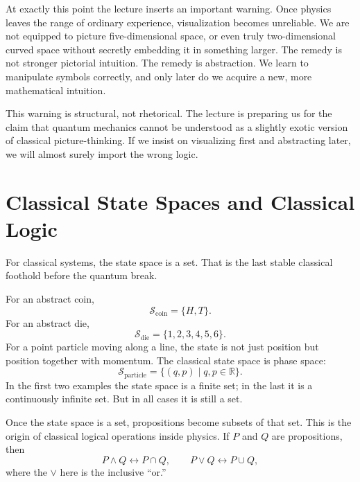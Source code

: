 At exactly this point the lecture inserts an important warning. Once physics leaves the range of ordinary experience, visualization becomes unreliable. We are not equipped to picture five-dimensional space, or even truly two-dimensional curved space without secretly embedding it in something larger. The remedy is not stronger pictorial intuition. The remedy is abstraction. We learn to manipulate symbols correctly, and only later do we acquire a new, more mathematical intuition.

\begin{remark}
This warning is structural, not rhetorical. The lecture is preparing us for the claim that quantum mechanics cannot be understood as a slightly exotic version of classical picture-thinking. If we insist on visualizing first and abstracting later, we will almost surely import the wrong logic.
\end{remark}

\section{Classical State Spaces and Classical Logic}

For classical systems, the state space is a set. That is the last stable classical foothold before the quantum break.

For an abstract coin,
\begin{equation}
\mathcal{S}_{\mathrm{coin}}=\{H,T\}.
\end{equation}
For an abstract die,
\begin{equation}
\mathcal{S}_{\mathrm{die}}=\{1,2,3,4,5,6\}.
\end{equation}
For a point particle moving along a line, the state is not just position but position together with momentum. The classical state space is phase space:
\begin{equation}
\mathcal{S}_{\mathrm{particle}}=\{(q,p)\mid q,p\in\mathbb{R}\}.
\end{equation}
In the first two examples the state space is a finite set; in the last it is a continuously infinite set. But in all cases it is still a set.

Once the state space is a set, propositions become subsets of that set. This is the origin of classical logical operations inside physics. If \(P\) and \(Q\) are propositions, then
\begin{equation}
P\wedge Q \leftrightarrow P\cap Q,
\qquad
P\vee Q \leftrightarrow P\cup Q,
\end{equation}
where the \( \vee \) here is the inclusive ``or.''

